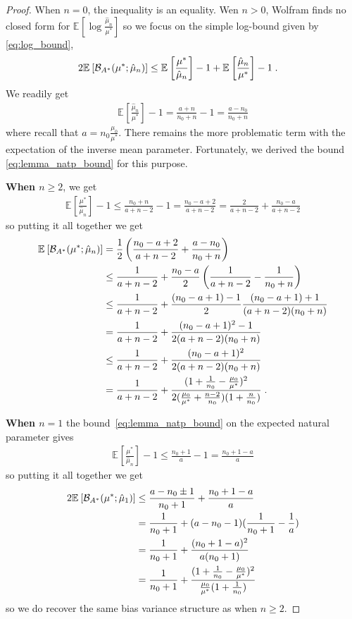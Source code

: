 \documentclass{article}
\newcommand*{\expect}[2][]{\ensuremath{\mathbb{E}_{#1} \left[ #2 \right] }} %
\newcommand{\logpart}{A}
\newcommand{\bregmanconj}{\cB_{\logpart^*}}
\newcommand{\MAPm}{\hat \mu_n}
\begin{document}
\begin{proof}
When $n=0$, the inequality is an equality. 
Wen $n>0$, Wolfram finds no closed form for $\expect{\log\frac{\MAPm}{\mu^*}}$ so we focus on the simple log-bound given by \eqref{eq:log_bound},
\begin{align}
	2\expect{\bregmanconj(\mu^*; \MAPm)} 
	&\leq \expect{\frac{\mu^*}{\MAPm}} -1  + \expect{\frac{\MAPm}{\mu^*}} - 1 \; .
\end{align}
We readily get 
\begin{align}
	 \expect{\frac{\MAPm}{\mu^*}} - 1 = \frac{a+n}{n_0+n} - 1 = \frac{a - n_0}{n_0+n}
\end{align}
where recall that $a=n_0\frac{\mu_0}{\mu^*}$. 
There remains the more problematic term with the expectation of the inverse mean parameter.
Fortunately, we derived the bound \eqref{eq:lemma_natp_bound} for this purpose.

\textbf{When $n\geq 2$}, we get 
\begin{align}
	\expect{\frac{\mu^*}{\MAPm}} - 1 
	\leq \frac{n_0 + n}{a +n - 2} -1
	= \frac{n_0 - a + 2}{a +n - 2}
	 = \frac{2}{a +n - 2} + \frac{n_0 - a}{a +n - 2}
\end{align}
so putting it all together we get 
\begin{align}
	\expect{\bregmanconj(\mu^*; \MAPm)} 
	& = \half \left(\frac{n_0 - a + 2}{a +n - 2}  + \frac{a - n_0}{n_0+n} \right )\\
	&\leq \frac{1}{a+n-2} + \frac{n_0-a}{2}  \left( \inv{a+n-2} - \inv{n_0+n} \right)\\
	&\leq \frac{1}{a+n-2} + \frac{(n_0-a + 1) - 1}{2}  \frac{(n_0 - a + 1) + 1}{(a+n-2)(n_0+n)} \\
	&= \frac{1}{a+n-2} + \frac{(n_0 - a +1)^2 - 1}{2(a+n-2)(n_0+n)} \\
	&\leq \frac{1}{a+n-2} + \frac{(n_0 - a +1)^2}{2(a+n-2)(n_0 + n)} \\
	&= \frac{1}{a+n-2} + \frac{(1 + \inv{n_0} - \frac{\mu_0}{\mu^*})^2}{2 (\frac{\mu_0}{\mu^*}+\frac{n-2}{n_0})(1 + \frac{n}{n_0} )} \; .
\end{align}

\textbf{When $n=1$} the bound~\eqref{eq:lemma_natp_bound}  on the expected natural parameter gives
\begin{align}
	\expect{\frac{\mu^*}{\MAPm}} - 1 
	\leq \frac{n_0 + 1}{a} -1
	= \frac{n_0 +1 - a}{a}
\end{align}
so putting it all together we get
\begin{align}
	2\expect{\bregmanconj(\mu^*; \hat \mu_1)} 
	&\leq \frac{a - n_0 \pm 1}{n_0 + 1}  + \frac{n_0 +1 - a }{a} \\
	& = \inv{n_0+1}  + ( a - n_0 - 1)(\inv{n_0+1} - \inv{a}) \\
	& = \inv{n_0+1}  + \frac{(n_0 + 1 -a)^2}{a(n_0+1)}\\
	&= \inv{n_0+1}  + \frac{(1 + \inv{n_0} - \frac{\mu_0}{\mu^*})^2}{\frac{\mu_0}{\mu^*}(1 + \inv{n_0} )} 
\end{align}
so we do recover the same bias variance structure as when $n\geq2$.
\end{proof}
\end{document}
